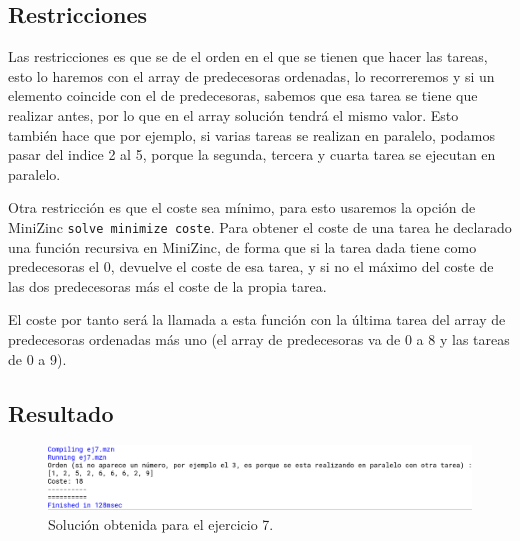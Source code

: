 \documentclass[11pt, spanish]{article}
\begin{document}
\subsection{Restricciones}

Las restricciones es que se de el orden en el que se tienen que hacer las tareas, esto lo haremos con el array de predecesoras ordenadas, lo recorreremos y si un elemento coincide con el de predecesoras, sabemos que esa tarea se tiene que realizar antes, por lo que en el array solución tendrá el mismo valor. Esto también hace que por ejemplo, si varias tareas se realizan en paralelo, podamos pasar del indice 2 al 5, porque la segunda, tercera y cuarta tarea se ejecutan en paralelo.

Otra restricción es que el coste sea mínimo, para esto usaremos la opción de MiniZinc \texttt{solve minimize coste}. Para obtener el coste de una tarea he declarado una función recursiva en MiniZinc, de forma que si la tarea dada tiene como predecesoras el 0, devuelve el coste de esa tarea, y si no el máximo del coste de las dos predecesoras más el coste de la propia tarea.

El coste por tanto será la llamada a esta función con la última tarea del array de predecesoras ordenadas más uno (el array de predecesoras va de 0 a 8 y las tareas de 0 a 9).

\subsection{Resultado}


\begin{figure}[H]
  \centering
      \includegraphics[scale = 0.30]{sol7.png}
 		 \caption{Solución obtenida para el ejercicio 7.}
  		\label{fig:ej7}

\end{figure}



\end{document}
